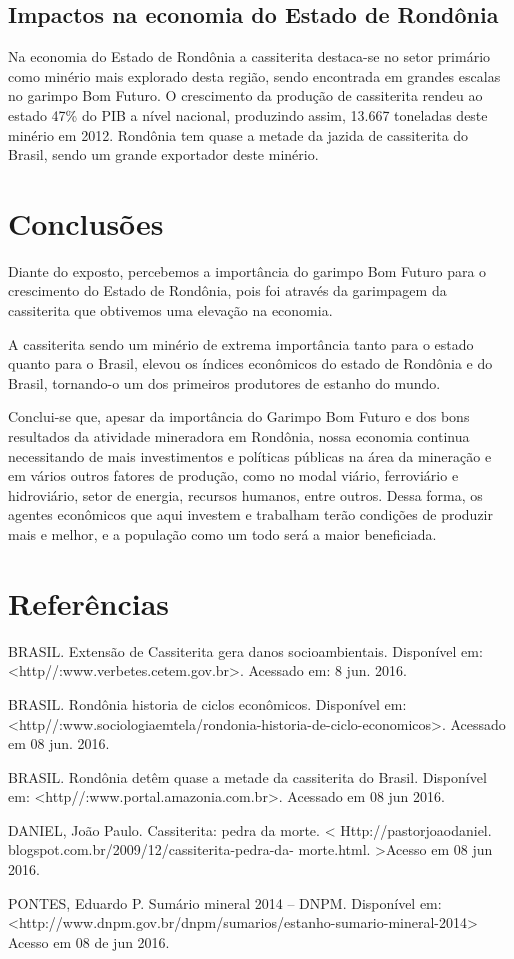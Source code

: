 \documentclass[article,12pt,onesidea,4paper,english,brazil]{abntex2}
\begin{document}
\subsection*{Impactos na economia do Estado de Rondônia}

	Na economia do Estado de Rondônia a cassiterita destaca-se no setor primário como minério mais explorado desta região, sendo encontrada em grandes escalas no garimpo Bom Futuro. O crescimento da produção de cassiterita rendeu ao estado 47\% do PIB a nível nacional, produzindo assim, 13.667 toneladas deste minério em 2012. Rondônia tem quase a metade da jazida de cassiterita do Brasil, sendo um grande exportador deste minério.
	
	\section*{Conclusões}
	
Diante do exposto, percebemos a importância do garimpo Bom Futuro para o crescimento do Estado de Rondônia, pois foi através da garimpagem da cassiterita que obtivemos uma elevação na economia.

A cassiterita sendo um minério de extrema importância tanto para o estado quanto para o Brasil, elevou os índices econômicos do estado de Rondônia e do Brasil, tornando-o um dos primeiros produtores de estanho do mundo.

Conclui-se que, apesar da importância do Garimpo Bom Futuro e dos bons resultados da atividade mineradora em Rondônia, nossa economia continua necessitando de mais investimentos e políticas públicas na área da mineração e em vários outros fatores de produção, como no modal viário, ferroviário e hidroviário, setor de energia, recursos humanos, entre outros. Dessa forma, os agentes econômicos que aqui investem e trabalham terão condições de produzir mais e melhor, e a população como um todo será a maior beneficiada.
	
	\section*{Referências}
	
	\sloppy
	
\noindent BRASIL. Extensão de Cassiterita gera danos socioambientais. Disponível em:
<http//:www.verbetes.cetem.gov.br>. Acessado em: 8 jun. 2016.

\noindent BRASIL. Rondônia historia de ciclos econômicos. Disponível em:<http//:www.sociologiaemtela/rondonia-historia-de-ciclo-economicos>. Acessado em 08 jun. 2016.

\noindent BRASIL. Rondônia detêm quase a metade da cassiterita do Brasil. Disponível em: <http//:www.portal.amazonia.com.br>. Acessado em 08 jun 2016.

\noindent DANIEL, João Paulo. Cassiterita: pedra da morte.
< Http://pastorjoaodaniel. blogspot.com.br/2009/12/cassiterita-pedra-da- morte.html. >Acesso em 08 jun 2016.

\noindent PONTES, Eduardo P. Sumário mineral 2014 – DNPM. Disponível em:
<http://www.dnpm.gov.br/dnpm/sumarios/estanho-sumario-mineral-2014> Acesso em 08 de jun 2016.
\end{document}
